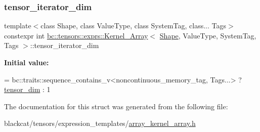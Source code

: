 \mbox{\label{structbc_1_1tensors_1_1exprs_1_1Kernel__Array_ab9c51a920183d5e5a99cd642c76d368f}} 
\subsubsection{\texorpdfstring{tensor\+\_\+iterator\+\_\+dim}{tensor\_iterator\_dim}}
{\footnotesize\ttfamily template$<$class Shape, class Value\+Type, class System\+Tag, class... Tags$>$ \\
constexpr int \hyperlink{structbc_1_1tensors_1_1exprs_1_1Kernel__Array}{bc\+::tensors\+::exprs\+::\+Kernel\+\_\+\+Array}$<$ \hyperlink{structbc_1_1Shape}{Shape}, Value\+Type, System\+Tag, Tags $>$\+::tensor\+\_\+iterator\+\_\+dim\hspace{0.3cm}{\ttfamily [static]}}

{\bfseries Initial value\+:}
\begin{DoxyCode}
=
        bc::traits::sequence\_contains\_v<noncontinuous\_memory\_tag, Tags...> ?
                \hyperlink{structbc_1_1tensors_1_1exprs_1_1Kernel__Array_ae5d17962cb9d81c7e0d205bb8f454d68}{tensor\_dim} : 1
\end{DoxyCode}


The documentation for this struct was generated from the following file\+:\begin{DoxyCompactItemize}
\item 
blackcat/tensors/expression\+\_\+templates/\hyperlink{array__kernel__array_8h}{array\+\_\+kernel\+\_\+array.\+h}\end{DoxyCompactItemize}

